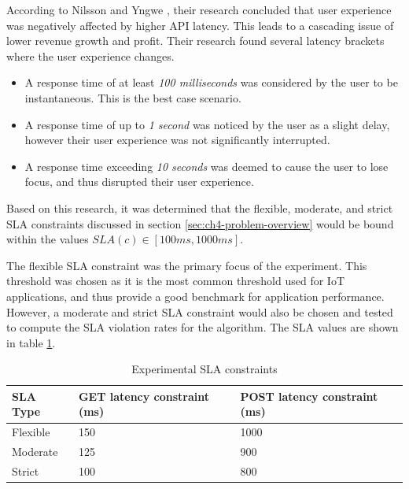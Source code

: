 According to Nilsson and Yngwe \cite{nilsson2022api}, their research concluded that user experience was negatively affected by higher API latency. This leads to a cascading issue of lower revenue growth and profit. Their research found several latency brackets where the user experience changes.

\begin{itemize}
    \item A response time of at least \textit{100 milliseconds} was considered by the user to be instantaneous. This is the best case scenario.
    \item A response time of up to \textit{1 second} was noticed by the user as a slight delay, however their user experience was not significantly interrupted.
    \item A response time exceeding \textit{10 seconds} was deemed to cause the user to lose focus, and thus disrupted their user experience.
\end{itemize}

Based on this research, it was determined that the flexible, moderate, and strict SLA constraints discussed in section \ref{sec:ch4-problem-overview} would be bound within the values $SLA(c) \in [100ms, 1000ms]$.\par

The flexible SLA constraint was the primary focus of the experiment. This threshold was chosen as it is the most common threshold used for IoT applications, and thus provide a good benchmark for application performance. However, a moderate and strict SLA constraint would also be chosen and tested to compute the SLA violation rates for the algorithm. The SLA values are shown in table \ref{tab:experiment-sla-values}.\par

\begin{table}
    \caption{Experimental SLA constraints}\label{tab:experiment-sla-values}
    \centering
    \begin{tabular}{|l|l|l|}
        \hline
        SLA Type & GET latency constraint (ms) & POST latency constraint (ms)\\
        \hline
        Flexible    & 150   & 1000\\
        Moderate    & 125   & 900\\
        Strict      & 100   & 800\\
        \hline
    \end{tabular}
\end{table}

